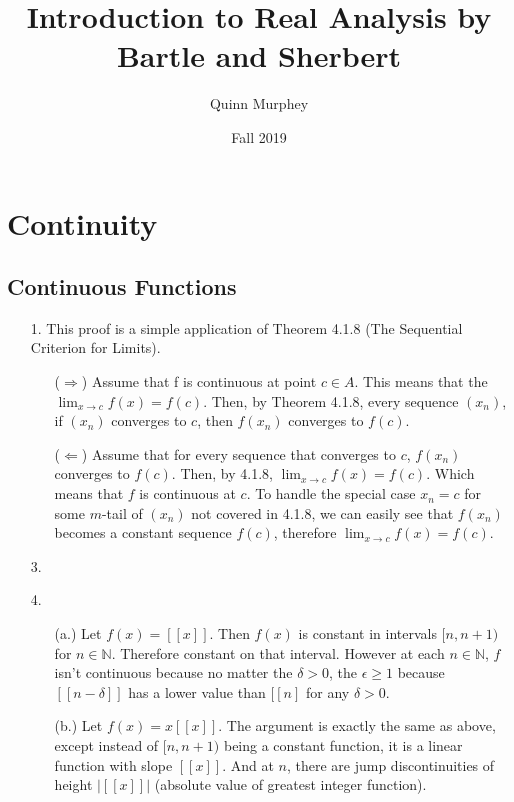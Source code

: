 \documentclass[letter paper, 11pt]{article}
\title{Introduction to Real Analysis by Bartle and Sherbert}
\author{Quinn Murphey}
\date{Fall 2019}
\begin{document}
\maketitle
\setcounter{section}{4}
\section{Continuity}
\subsection{Continuous Functions}
\begin{itemize}
    \item[1.] This proof is a simple application of Theorem 4.1.8 (The Sequential Criterion for Limits).
    
    \begin{itemize}
        \item[($\Rightarrow$)] Assume that f is continuous at point $c\in A$. This means that the $\lim_{x\rightarrow c}f(x) = f(c)$. Then, by Theorem 4.1.8, every sequence $(x_n)$, if $(x_n)$ converges to $c$, then $f(x_n)$ converges to $f(c)$.
        
        \item[($\Leftarrow$)] Assume that for every sequence that converges to $c$, $f(x_n)$ converges to $f(c)$. Then, by 4.1.8, $\lim_{x\rightarrow c} f(x) = f(c)$. Which means that $f$ is continuous at $c$. To handle the special case $x_n=c$ for some $m$-tail of $(x_n)$ not covered in 4.1.8, we can easily see that $f(x_n)$ becomes a constant sequence $f(c)$, therefore $\lim_{x\rightarrow c} f(x) = f(c)$.
    \end{itemize}
    
    \item[3.] 
    
    \item[4.]
    \begin{itemize}
        \item[(a.)] Let $f(x)=[[x]]$. Then $f(x)$ is constant in intervals $[n,n+1)$ for $n\in\mathbb{N}$. Therefore constant on that interval. However at each $n\in\mathbb{N}$, $f$ isn't continuous because no matter the $\delta>0$, the $\epsilon\geq 1$ because $[[n-\delta]]$ has a lower value than $[[n]$ for any $\delta>0$.
        
        \item[(b.)] Let $f(x)= x[[x]]$. The argument is exactly the same as above, except instead of $[n,n+1)$ being a constant function, it is a linear function with slope $[[x]]$. And at $n$, there are jump discontinuities of height $|[[x]]|$ (absolute value of greatest integer function).
        

\end{itemize}
\end{itemize}
\end{document}
